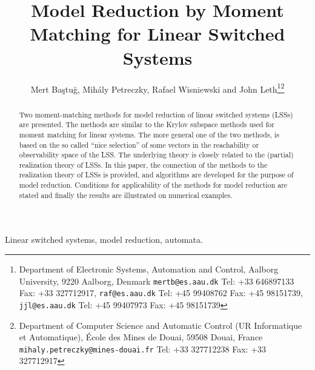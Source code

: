\documentclass[journal]{IEEEtran}
\begin{document}
\title{Model Reduction by Moment Matching for Linear Switched Systems}


\author{Mert Ba\c{s}tu\u{g}, Mih\'{a}ly Petreczky, Rafael Wisniewski and John Leth\thanks{Department of Electronic Systems, Automation and Control, Aalborg University, 9220 Aalborg, Denmark {\tt\small mertb@es.aau.dk} Tel: +33 646897133 Fax: +33 327712917, {\tt\small raf@es.aau.dk} Tel: +45 99408762 Fax: +45 98151739, {\tt\small jjl@es.aau.dk} Tel: +45 99407973 Fax: +45 98151739}\thanks{Department of Computer Science and Automatic Control (UR Informatique et Automatique), \'{E}cole des Mines de Douai, 59508 Douai, France {\tt\small mihaly.petreczky@mines-douai.fr} Tel: +33 327712238 Fax: +33 327712917}}























\maketitle

\begin{abstract}
Two moment-matching methods for model reduction of linear switched systems (LSSs) are presented. The methods are similar to the Krylov subspace methods used for moment matching for linear systems. The more general one of the two methods, is based on the so called ``nice selection'' of some vectors in the reachability or observability space of the LSS. The underlying theory is closely related to the (partial) realization theory of LSSs. In this paper, the connection of the methods to the realization theory of LSSs is provided, and algorithms are developed for the purpose of model reduction. Conditions for applicability of the methods for model reduction are stated and finally the results are illustrated on numerical examples.
\end{abstract}

\begin{IEEEkeywords}
Linear switched systems, model reduction, automata.
\end{IEEEkeywords}
\end{document}
